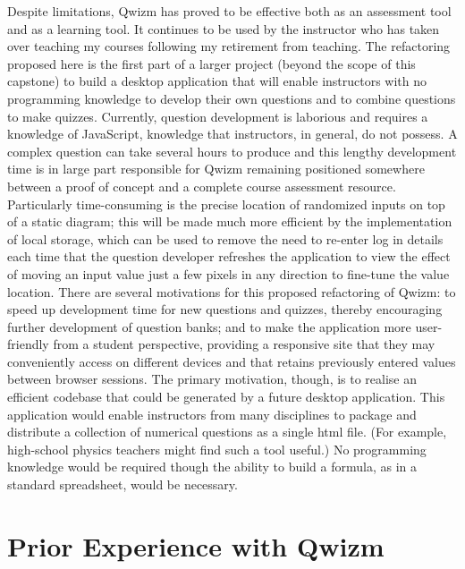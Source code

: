 \documentclass{tufte-handout}
\begin{document}
Despite limitations, Qwizm has proved to be effective both as an assessment tool and as a learning tool. It continues to be used by the instructor who has taken over teaching my courses following my retirement from teaching. The refactoring proposed here is the first part of a larger project (beyond the scope of this capstone) to build a desktop application that will enable instructors with no programming knowledge to develop their own questions and to combine questions to make quizzes.
\parm
Currently, question development is laborious and requires a knowledge of JavaScript, knowledge that instructors, in general, do not possess. A complex question can take several hours to produce and this lengthy development time is in large part responsible for Qwizm remaining positioned somewhere between a proof of concept and a complete course assessment resource.
\parm
Particularly time-consuming is the precise location of randomized inputs on top of a static diagram; this will be made much more efficient by the implementation of local storage, which can be used to remove the need to re-enter log in details each time that the question developer refreshes the application to view the effect of moving an input value just a few pixels in any direction to fine-tune the value location.
\parm
There are several motivations for this proposed refactoring of Qwizm: to speed up development time for new questions and quizzes, thereby encouraging further development of question banks; and to make the application more user-friendly from a student perspective, providing a responsive site that they may conveniently access on different devices and that retains previously entered values between browser sessions.
\parm
The primary motivation, though, is to realise an efficient codebase that could be generated by a future desktop application. This application would enable instructors from many disciplines to package and distribute a collection of numerical questions as a single html file. (For example, high-school physics teachers might find such a tool useful.) No programming knowledge would be required though the ability to build a formula, as in a standard spreadsheet, would be necessary.


\section{Prior Experience with Qwizm}\label{sec:pedagogy}
\end{document}

